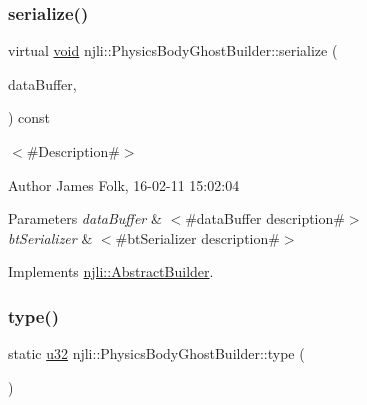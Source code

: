 \subsubsection{\texorpdfstring{serialize()}{serialize()}}
{\footnotesize\ttfamily virtual \mbox{\hyperlink{_thread_8h_af1e856da2e658414cb2456cb6f7ebc66}{void}} njli\+::\+Physics\+Body\+Ghost\+Builder\+::serialize (\begin{DoxyParamCaption}\item[{\mbox{\hyperlink{_thread_8h_af1e856da2e658414cb2456cb6f7ebc66}{void}} $\ast$}]{data\+Buffer,  }\item[{bt\+Serializer $\ast$}]{ }\end{DoxyParamCaption}) const\hspace{0.3cm}{\ttfamily [virtual]}}



$<$\#\+Description\#$>$ 

\begin{DoxyAuthor}{Author}
James Folk, 16-\/02-\/11 15\+:02\+:04
\end{DoxyAuthor}

\begin{DoxyParams}{Parameters}
{\em data\+Buffer} & $<$\#data\+Buffer description\#$>$ \\
\hline
{\em bt\+Serializer} & $<$\#bt\+Serializer description\#$>$ \\
\hline
\end{DoxyParams}


Implements \mbox{\hyperlink{classnjli_1_1_abstract_builder_ab66b774e02ccb9da554c9aab7fa6d981}{njli\+::\+Abstract\+Builder}}.

\mbox{\label{classnjli_1_1_physics_body_ghost_builder_a7c64e5d2f7100006b10283248abed043}} 
\subsubsection{\texorpdfstring{type()}{type()}}
{\footnotesize\ttfamily static \mbox{\hyperlink{_util_8h_a10e94b422ef0c20dcdec20d31a1f5049}{u32}} njli\+::\+Physics\+Body\+Ghost\+Builder\+::type (\begin{DoxyParamCaption}{ }\end{DoxyParamCaption})\hspace{0.3cm}{\ttfamily [static]}}

